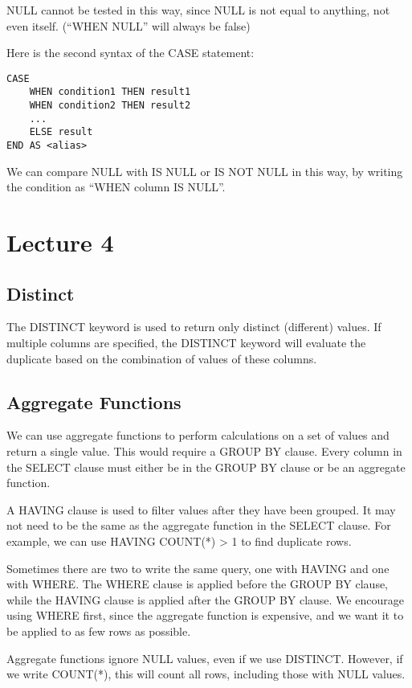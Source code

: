 \documentclass[a4paper,12pt]{article}
\begin{document}
NULL cannot be tested in this way, since NULL is not equal to anything, not even itself. (``WHEN NULL'' will always be false)

Here is the second syntax of the CASE statement:
\begin{verbatim}
CASE
	WHEN condition1 THEN result1
	WHEN condition2 THEN result2
	...
	ELSE result
END AS <alias>
\end{verbatim}

We can compare NULL with IS NULL or IS NOT NULL in this way, by writing the condition as ``WHEN column IS NULL''.

\section{Lecture 4}

\subsection{Distinct}

The DISTINCT keyword is used to return only distinct (different) values.
If multiple columns are specified, the DISTINCT keyword will evaluate the duplicate based on the combination of values of these columns.

\subsection{Aggregate Functions}

We can use aggregate functions to perform calculations on a set of values and return a single value.
This would require a GROUP BY clause.
Every column in the SELECT clause must either be in the GROUP BY clause or be an aggregate function.

A HAVING clause is used to filter values after they have been grouped.
It may not need to be the same as the aggregate function in the SELECT clause.
For example, we can use HAVING COUNT(*) > 1 to find duplicate rows.

Sometimes there are two to write the same query, one with HAVING and one with WHERE.
The WHERE clause is applied before the GROUP BY clause, while the HAVING clause is applied after the GROUP BY clause.
We encourage using WHERE first, since the aggregate function is expensive, and we want it to be applied to as few rows as possible.

Aggregate functions ignore NULL values, even if we use DISTINCT.
However, if we write COUNT(*), this will count all rows, including those with NULL values.
\end{document}
